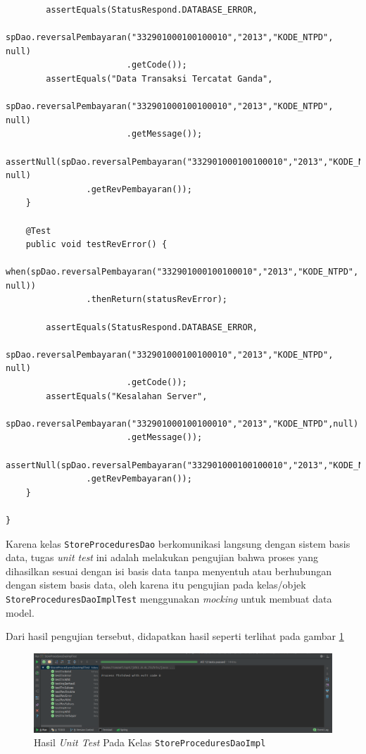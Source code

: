 \documentclass[pdftex,12pt, oneside]{article}
\begin{document}
\begin{enumerate}[A.]
\begin{enumerate}[1.]
\begin{lstlisting}
        assertEquals(StatusRespond.DATABASE_ERROR,
                spDao.reversalPembayaran("332901000100100010","2013","KODE_NTPD", null)
                        .getCode());
        assertEquals("Data Transaksi Tercatat Ganda",
                spDao.reversalPembayaran("332901000100100010","2013","KODE_NTPD", null)
                        .getMessage());
        assertNull(spDao.reversalPembayaran("332901000100100010","2013","KODE_NTPD", null)
                .getRevPembayaran());
    }

    @Test
    public void testRevError() {
        when(spDao.reversalPembayaran("332901000100100010","2013","KODE_NTPD", null))
                .thenReturn(statusRevError);

        assertEquals(StatusRespond.DATABASE_ERROR,
                spDao.reversalPembayaran("332901000100100010","2013","KODE_NTPD", null)
                        .getCode());
        assertEquals("Kesalahan Server",
                spDao.reversalPembayaran("332901000100100010","2013","KODE_NTPD",null)
                        .getMessage());
        assertNull(spDao.reversalPembayaran("332901000100100010","2013","KODE_NTPD",null)
                .getRevPembayaran());
    }

}
    \end{lstlisting}
    
    Karena kelas \texttt{StoreProceduresDao} berkomunikasi langsung dengan sistem basis data, tugas \textit{unit test} ini adalah melakukan pengujian bahwa proses yang dihasilkan sesuai dengan isi basis data tanpa menyentuh atau berhubungan dengan sistem basis data, oleh karena itu pengujian pada kelas/objek \texttt{StoreProceduresDaoImplTest} menggunakan \textit{mocking} untuk membuat data model.
    
    Dari hasil pengujian tersebut, didapatkan hasil seperti terlihat pada gambar \ref{fig:sp-ut}
    
    \begin{figure}[H]
      \centering
      \includegraphics[width=1\textwidth]{./resources/02-sp-ut}
      \caption{Hasil \textit{Unit Test} Pada Kelas \texttt{StoreProceduresDaoImpl}}
      \label{fig:sp-ut}
    \end{figure}
    

\end{enumerate}
\end{enumerate}
\end{document}
